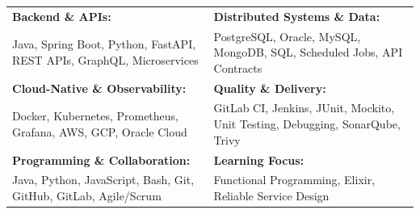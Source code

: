 \renewcommand{\arraystretch}{1.2}

\begin{tabular}{p{} p{}}
    \textbf{Backend \& APIs:} & \textbf{Distributed Systems \& Data:} \\
    Java, Spring Boot, Python, FastAPI, REST APIs, GraphQL, Microservices & PostgreSQL, Oracle, MySQL, MongoDB, SQL, Scheduled Jobs, API Contracts \\

    \textbf{Cloud-Native \& Observability:} & \textbf{Quality \& Delivery:} \\
    Docker, Kubernetes, Prometheus, Grafana, AWS, GCP, Oracle Cloud & GitLab CI, Jenkins, JUnit, Mockito, Unit Testing, Debugging, SonarQube, Trivy \\

    \textbf{Programming \& Collaboration:} & \textbf{Learning Focus:} \\
    Java, Python, JavaScript, Bash, Git, GitHub, GitLab, Agile/Scrum & Functional Programming, Elixir, Reliable Service Design \\
\end{tabular}
